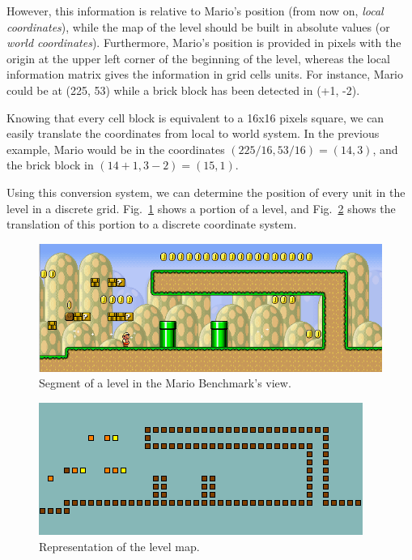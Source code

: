 \documentclass[conference]{IEEEtran}
\begin{document}
However, this information is relative to Mario's position (from now on, \textit{local
coordinates}), while the map of the level should be built in absolute values
(or \textit{world coordinates}). Furthermore, Mario's position is provided in pixels
with the origin at the upper left corner of the beginning of the level, whereas the 
local information matrix gives the information in grid cells units. For instance, Mario 
could be at (225, 53) while a brick block has been detected in (+1, -2).

Knowing that every cell block is equivalent to a 16x16 pixels square, we can 
easily translate the coordinates from local to world system. In the 
previous example, Mario would be in the coordinates $(225/16, 53/16) = 
(14,3)$, and the brick block in $(14+1, 3-2) = (15,1)$.

Using this conversion system, we can determine the position of every unit in the
level in a discrete grid. Fig.~\ref{fig:trap} shows a portion of a level, and 
Fig.~\ref{fig:trapOnlyMap} shows the translation of this portion to a 
discrete coordinate system.


\begin{figure} [ht]
	\begin{center}
	\includegraphics[scale=0.45]{images/trap}
	\caption{Segment of a level in the Mario Benchmark's view.}
	\label{fig:trap}
	\end{center}
\end{figure}


\begin{figure} [ht]
	\begin{center}
	\includegraphics[scale=0.75]{images/trapOnlyMap}
	\caption{Representation of the level map.}
	\label{fig:trapOnlyMap}
	\end{center}
\end{figure}
\end{document}
